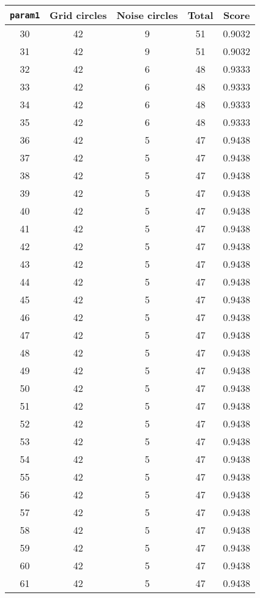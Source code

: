 \documentclass[letterpaper, 12pt]{article}
\begin{document}
\begin{longtable}{|c|c|c|c|c|}
\hline
\textbf{\texttt{param1}} & \textbf{Grid circles} & \textbf{Noise circles} & \textbf{Total} & \textbf{Score} \\
\hline
30 & 42 & 9 & 51 & 0.9032 \\
\hline
31 & 42 & 9 & 51 & 0.9032 \\
\hline
32 & 42 & 6 & 48 & 0.9333 \\
\hline
33 & 42 & 6 & 48 & 0.9333 \\
\hline
34 & 42 & 6 & 48 & 0.9333 \\
\hline
35 & 42 & 6 & 48 & 0.9333 \\
\hline
36 & 42 & 5 & 47 & 0.9438 \\
\hline
37 & 42 & 5 & 47 & 0.9438 \\
\hline
38 & 42 & 5 & 47 & 0.9438 \\
\hline
39 & 42 & 5 & 47 & 0.9438 \\
\hline
40 & 42 & 5 & 47 & 0.9438 \\
\hline
41 & 42 & 5 & 47 & 0.9438 \\
\hline
42 & 42 & 5 & 47 & 0.9438 \\
\hline
43 & 42 & 5 & 47 & 0.9438 \\
\hline
44 & 42 & 5 & 47 & 0.9438 \\
\hline
45 & 42 & 5 & 47 & 0.9438 \\
\hline
46 & 42 & 5 & 47 & 0.9438 \\
\hline
47 & 42 & 5 & 47 & 0.9438 \\
\hline
48 & 42 & 5 & 47 & 0.9438 \\
\hline
49 & 42 & 5 & 47 & 0.9438 \\
\hline
50 & 42 & 5 & 47 & 0.9438 \\
\hline
51 & 42 & 5 & 47 & 0.9438 \\
\hline
52 & 42 & 5 & 47 & 0.9438 \\
\hline
53 & 42 & 5 & 47 & 0.9438 \\
\hline
54 & 42 & 5 & 47 & 0.9438 \\
\hline
55 & 42 & 5 & 47 & 0.9438 \\
\hline
56 & 42 & 5 & 47 & 0.9438 \\
\hline
57 & 42 & 5 & 47 & 0.9438 \\
\hline
58 & 42 & 5 & 47 & 0.9438 \\
\hline
59 & 42 & 5 & 47 & 0.9438 \\
\hline
60 & 42 & 5 & 47 & 0.9438 \\
\hline
61 & 42 & 5 & 47 & 0.9438 \\

\end{longtable}
\end{document}
